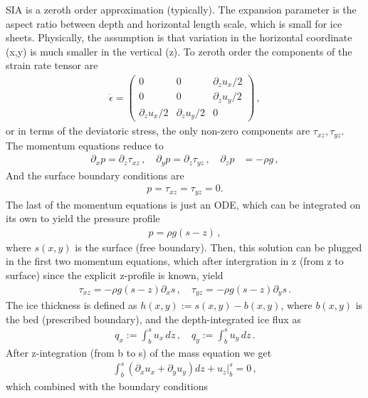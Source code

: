 \documentclass[11pt,a4paper]{article}
\newcommand{\p}{\partial}
\begin{document}
SIA is a zeroth order approximation (typically). The expansion parameter is the aspect ratio between depth and horizontal length scale, which is small for ice sheets. Physically, the assumption is that variation in the horizontal coordinate (x,y) is much smaller in the vertical (z). To zeroth order the components of the strain rate tensor are
\begin{align}
     \dot{\epsilon} = 
     \begin{pmatrix}
        0 & 0 & \p_z u_x / 2 \\
        0 & 0 & \p_z u_y / 2 \\
        \p_z u_x / 2 & \p_z u_y / 2 & 0
     \end{pmatrix}
     \,,
\end{align}
or in terms of the deviatoric stress, the only non-zero components are $\tau_{xz}, \tau_{yz}$.
The momentum equations reduce to
\begin{align}
    \p_x p = \p_z \tau_{xz} \,,
    \quad
    \p_y p  = \p_z \tau_{yz} \,,
    \quad
    \p_z p & = - \rho g \,,
\end{align}
And the surface boundary conditions are
\begin{align}
    p = \tau_{xz} = \tau_{yz} = 0.
\end{align}
The last of the momentum equations is just an ODE, which can be integrated on its own to yield the pressure profile
\begin{align}
    p = \rho g (s - z) \,,
\end{align}
where $s(x,y)$ is the surface (free boundary). Then, this solution can be plugged in the first two momentum equations, which after intergration in z (from z to surface) since the explicit z-profile is known, yield
\begin{align}
    \tau_{xz}  = - \rho g (s - z) \p_x s \,,
    \quad
    \tau_{yz}  = - \rho g (s - z) \p_y s \,.
\end{align}
The ice thickness is defined as $h(x,y) := s(x,y) - b(x,y)$, where $b(x,y)$ is the bed (prescribed boundary), and the depth-integrated ice flux as
\begin{align}
    q_x := \int_b^s u_x \, dz
    \,,
    \quad
    q_y := \int_b^s u_y \, dz
    \,.
\end{align}
After z-integration (from b to s) of the mass equation we get
\begin{align}
    \int_b^s \left( \p_x u_x + \p_y u_y \right) dz + u_z |_b^s = 0 \,,
\end{align}
which combined with the boundary conditions
\end{document}

